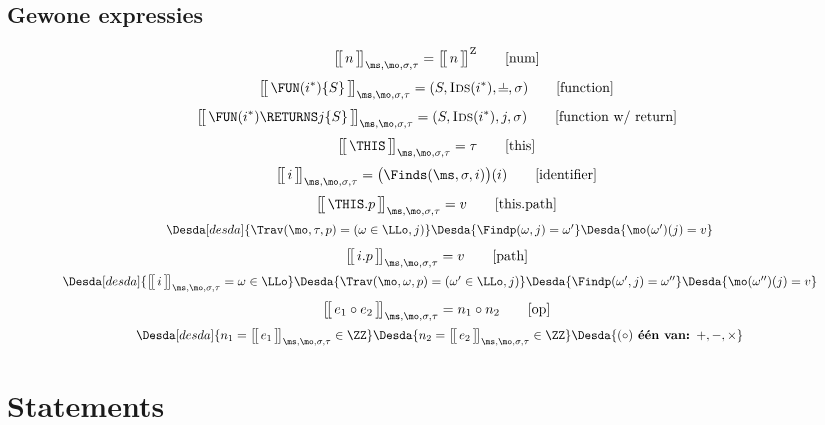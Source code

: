 \subsection{Gewone expressies}
%
\begin{equation}
  \Express{n}{\ms,\mo,\sigma,\tau} = \Express[Z]{n}{}
  \tag*{[num]}
\end{equation}
%
\begin{equation}
  \Express{\FUN (i^*) \{S\}}{\ms,\mo,\sigma,\tau} = (S, \textsc{Ids}(i^*), \nil, \sigma)
  \tag*{[function]}
\end{equation}
%
\begin{equation}
  \Express{\FUN (i^*) \RETURNS j \{S\}}{\ms,\mo,\sigma,\tau} = (S, \textsc{Ids}(i^*), j, \sigma)
  \tag*{[function w/ return]}
\end{equation}
%
\begin{equation}
  \Express{\THIS}{\ms,\mo,\sigma,\tau} = \tau
  \tag*{[this]}
\end{equation}
%
\begin{equation}
  \Express{i}{\ms,\mo,\sigma,\tau} = \big( \Finds(\ms, \sigma, i) \big)(i)
  \tag*{[identifier]}
\end{equation}
%
\begin{gather*}
  \Express{\THIS.p}{\ms,\mo,\sigma,\tau} = v
  \tag*{[this.path]} \\
  \Desdas{
    \Desda[desda]{\Trav(\mo, \tau, p) = (\omega \in \LLo, j)}
    \Desda{\Findp(\omega,j) = \omega'}
    \Desda{\mo(\omega')(j) = v}
  }
\end{gather*}
%
\begin{gather*}
  \Express{i.p}{\ms,\mo,\sigma,\tau} = v
  \tag*{[path]} \\
  \Desdas{
    \Desda[desda]{\Express{i}{\ms,\mo,\sigma,\tau} = \omega \in \LLo}
    \Desda{\Trav(\mo, \omega, p) = (\omega' \in \LLo, j)}
    \Desda{\Findp(\omega',j) = \omega''}
    \Desda{\mo(\omega'')(j) = v}
  }
\end{gather*}
%
\begin{gather*}
  \Express{e_1 \circ e_2}{\ms,\mo,\sigma,\tau} = n_1 \circ n_2
  \tag*{[op]} \\
  \Desdas{
    \Desda[desda]{n_1 = \Express{e_1}{\ms,\mo,\sigma,\tau} \in \ZZ}
    \Desda{n_2 = \Express{e_2}{\ms,\mo,\sigma,\tau} \in \ZZ}
    \Desda{(\circ) \textbf{ één van: } +, -, \times}
  }
\end{gather*}

\section{Statements}

